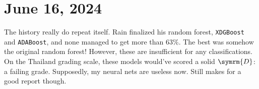 \section{June 16, 2024}

The history really do repeat itself. Rain finalized his random forest, \texttt{XDGBoost} and \texttt{ADABoost}, and none managed to get more than $63\%$. The best was somehow the original random forest! However, these are insufficient for any classifications. On the Thailand grading scale, these models would've scored a solid $\symrm{D}$: a failing grade. Supposedly, my neural nets are useless now. Still makes for a good report though.